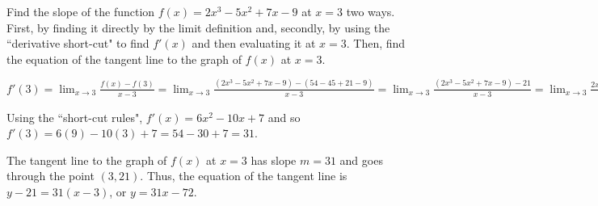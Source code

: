 \documentclass[nooutcomes]{ximera}
\begin{document}
	
	
	
			
			

\begin{problem}
Find the slope of the function $f(x) = 2x^3 - 5x^2 + 7x - 9$ at $x=3$ two ways.  First, by finding it directly by the limit definition and, secondly, by using the ``derivative short-cut" to find $f'(x)$ and then evaluating it at $x=3$.  Then, find the equation of the tangent line to the graph of $f(x)$ at $x=3$.
		\begin{freeResponse}
		$f'(3) = \lim_{x \to 3} \frac{f(x) - f(3)}{x-3}
		= \lim_{x \to 3} \frac{(2x^3 - 5x^2 + 7x - 9) - (54 - 45 + 21 - 9)}{x-3}
		= \lim_{x \to 3} \frac{(2x^3 - 5x^2 + 7x - 9) - 21}{x-3}
		= \lim_{x \to 3} \frac{2x^3 - 5x^2 + 7x - 30}{x-3}
		= \lim_{x \to 3} \frac{(x-3)(2x^2 + x + 10)}{x-3}
		= \lim_{x \to 3} (2x^2 + x + 10)
		= 18 + 3 + 10 = 31.$
		
		Using the ``short-cut rules", $f'(x) = 6x^2 - 10x + 7$ and so $f'(3) = 6(9) - 10(3) + 7 = 54 - 30 + 7 = 31$.
		
		The tangent line to the graph of $f(x)$ at $x=3$ has slope $m=31$ and goes through the point $(3,21)$.  Thus, the equation of the tangent line is $y-21=31(x-3)$, or $y = 31x -72$. 
		\end{freeResponse}
		
\end{problem}









	
	
	
	
	
	
	
	
	

	










								
				
				
	
\end{document}
